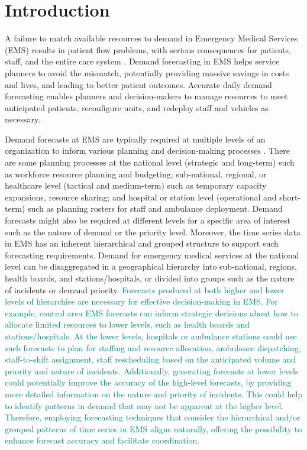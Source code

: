\documentclass[
  authoryear,
  preprint,
  3p]{elsarticle}
\begin{document}
\hypertarget{sec-intro}{%
\section{Introduction}\label{sec-intro}}

A failure to match available resources to demand in Emergency Medical
Services (EMS) results in patient flow problems, with serious
consequences for patients, staff, and the entire care system
\citep{ekstrom2015forecasting, ROSTAMITABAR20221197}. Demand forecasting
in EMS helps service planners to avoid the mismatch, potentially
providing massive savings in costs and lives, and leading to better
patient outcomes. Accurate daily demand forecasting enables planners and
decision-makers to manage resources to meet anticipated patients,
reconfigure units, and redeploy staff and vehicles as necessary.

Demand forecasts at EMS are typically required at multiple levels of an
organization to inform various planning and decision-making processes
\citep{hulshof2012taxonomic}. There are some planning processes at the
national level (strategic and long-term) such as workforce resource
planning and budgeting; sub-national, regional, or healthcare level
(tactical and medium-term) such as temporary capacity expansions,
resource sharing; and hospital or station level (operational and
short-term) such as planning rosters for staff and ambulance deployment.
Demand forecasts might also be required at different levels for a
specific area of interest such as the nature of demand or the priority
level. Moreover, the time series data in EMS has an inherent
hierarchical and grouped structure to support such forecasting
requirements. Demand for emergency medical services at the national
level can be disaggregated in a geographical hierarchy into
sub-national, regions, health boards, and stations/hospitals, or divided
into groups such as the nature of incidents or demand priority.
\textcolor{teal}{Forecasts produced at both higher and lower levels of hierarchies are necessary for effective decision-making in EMS. For example, control area EMS forecasts can inform strategic decisions about how to allocate limited resources to lower levels, such as health boards and stations/hospitals. At the lower levels, hospitals or ambulance stations could use such forecasts to plan for staffing and resource allocation, ambulance dispatching, staff-to-shift assignment, staff rescheduling based on the anticipated volume and priority and nature of incidents. Additionally, generating forecasts at lower levels could potentially improve the accuracy of the high-level forecasts, by providing more detailed information on the nature and priority of incidents. This could help to identify patterns in demand that may not be apparent at the higher level. Therefore, employing forecasting techniques that consider the hierarchical and/or grouped patterns of time series in EMS aligns naturally, offering the possibility to enhance forecast accuracy and facilitate coordination.}
\end{document}
